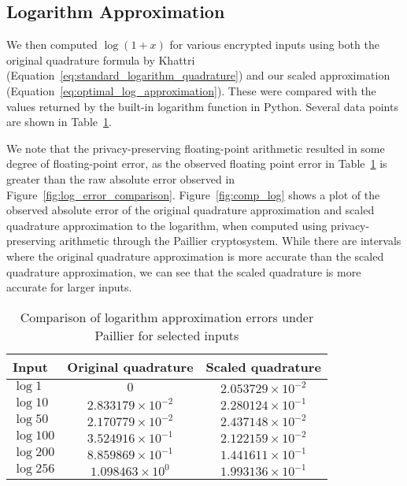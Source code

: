 \subsection{Logarithm Approximation}
We then computed $\log\left(1+x\right)$ for various encrypted inputs using both the original quadrature formula by Khattri (Equation~\ref{eq:standard_logarithm_quadrature}) and our scaled approximation (Equation~\ref{eq:optimal_log_approximation}). These were compared with the values returned by the built-in logarithm function in Python. Several data points are shown in Table~\ref{tab:log_approximation}.

We note that the privacy-preserving floating-point arithmetic resulted in some degree of floating-point error, as the observed floating point error in Table~\ref{tab:log_approximation} is greater than the raw absolute error observed in Figure~\ref{fig:log_error_comparison}. Figure~\ref{fig:comp_log} shows a plot of the observed absolute error of the original quadrature approximation and scaled quadrature approximation to the logarithm, when computed using privacy-preserving arithmetic through the Paillier cryptosystem. While there are intervals where the original quadrature approximation is more accurate than the scaled quadrature approximation, we can see that the scaled quadrature is more accurate for larger inputs.

\begin{table}[ht]
	\caption{Comparison of logarithm approximation errors under Paillier for selected inputs}
	\label{tab:log_approximation}
	\begin{tabular}{lcc}
		\toprule
		Input & Original quadrature & Scaled quadrature\\
		\midrule
		$\log 1$ & $0$ & $2.053729 \times 10^{-2}$\\
		$\log 10$ & $2.833179 \times 10^{-2} $ & $2.280124 \times 10^{-1}$\\
		$\log 50$ & $2.170779 \times 10^{-2}$ & $2.437148 \times 10^{-2}$\\
		$\log 100$ & $3.524916 \times 10^{-1}$ & $2.122159 \times 10^{-2}$\\
		$\log 200$ & $8.859869 \times 10^{-1}$ & $1.441611 \times 10^{-1}$\\
		$\log 256$ & $1.098463 \times 10^{0}$ & $1.993136 \times 10^{-1}$\\
	\bottomrule
\end{tabular}
\end{table}

